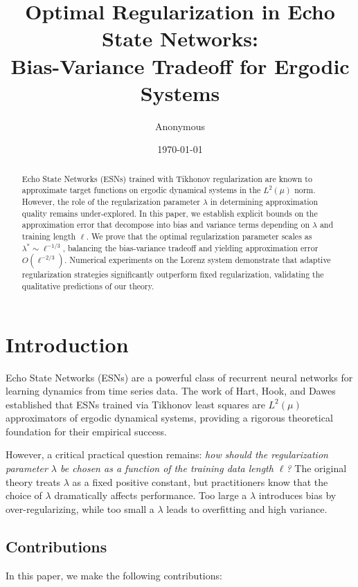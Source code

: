 \documentclass[11pt]{article}
\title{Optimal Regularization in Echo State Networks: \\Bias-Variance Tradeoff for Ergodic Systems}
\author{Anonymous}
\date{\today}
\theoremstyle{definition}
\theoremstyle{remark}
\begin{document}
\maketitle

\begin{abstract}
Echo State Networks (ESNs) trained with Tikhonov regularization are known to approximate target functions on ergodic dynamical systems in the $L^2(\mu)$ norm. However, the role of the regularization parameter $\lambda$ in determining approximation quality remains under-explored. In this paper, we establish explicit bounds on the approximation error that decompose into bias and variance terms depending on $\lambda$ and training length $\ell$. We prove that the optimal regularization parameter scales as $\lambda^* \sim \ell^{-1/3}$, balancing the bias-variance tradeoff and yielding approximation error $O(\ell^{-2/3})$. Numerical experiments on the Lorenz system demonstrate that adaptive regularization strategies significantly outperform fixed regularization, validating the qualitative predictions of our theory.
\end{abstract}

\section{Introduction}

Echo State Networks (ESNs) are a powerful class of recurrent neural networks for learning dynamics from time series data. The work of Hart, Hook, and Dawes \cite{Hart2021} established that ESNs trained via Tikhonov least squares are $L^2(\mu)$ approximators of ergodic dynamical systems, providing a rigorous theoretical foundation for their empirical success.

However, a critical practical question remains: \textit{how should the regularization parameter $\lambda$ be chosen as a function of the training data length $\ell$?} The original theory treats $\lambda$ as a fixed positive constant, but practitioners know that the choice of $\lambda$ dramatically affects performance. Too large a $\lambda$ introduces bias by over-regularizing, while too small a $\lambda$ leads to overfitting and high variance.

\subsection{Contributions}

In this paper, we make the following contributions:
\end{document}
